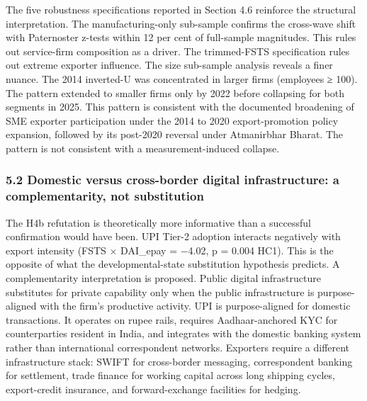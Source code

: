 \documentclass[
  12pt,a4paper]{article}
\begin{document}
The five robustness specifications reported in Section 4.6 reinforce the
structural interpretation. The manufacturing-only sub-sample confirms
the cross-wave shift with Paternoster z-tests within 12 per cent of
full-sample magnitudes. This rules out service-firm composition as a
driver. The trimmed-FSTS specification rules out extreme exporter
influence. The size sub-sample analysis reveals a finer nuance. The 2014
inverted-U was concentrated in larger firms (employees ≥ 100). The
pattern extended to smaller firms only by 2022 before collapsing for
both segments in 2025. This pattern is consistent with the documented
broadening of SME exporter participation under the 2014 to 2020
export-promotion policy expansion, followed by its post-2020 reversal
under Atmanirbhar Bharat. The pattern is not consistent with a
measurement-induced collapse.

\hypertarget{domestic-versus-cross-border-digital-infrastructure-a-complementarity-not-substitution}{%
\subsubsection{5.2 Domestic versus cross-border digital infrastructure:
a complementarity, not
substitution}\label{domestic-versus-cross-border-digital-infrastructure-a-complementarity-not-substitution}}

The H4b refutation is theoretically more informative than a successful
confirmation would have been. UPI Tier-2 adoption interacts negatively
with export intensity (FSTS × DAI\_epay = −4.02, p = 0.004 HC1). This is
the opposite of what the developmental-state substitution hypothesis
predicts. A complementarity interpretation is proposed. Public digital
infrastructure substitutes for private capability only when the public
infrastructure is purpose-aligned with the firm's productive activity.
UPI is purpose-aligned for domestic transactions. It operates on rupee
rails, requires Aadhaar-anchored KYC for counterparties resident in
India, and integrates with the domestic banking system rather than
international correspondent networks. Exporters require a different
infrastructure stack: SWIFT for cross-border messaging, correspondent
banking for settlement, trade finance for working capital across long
shipping cycles, export-credit insurance, and forward-exchange
facilities for hedging.
\end{document}
